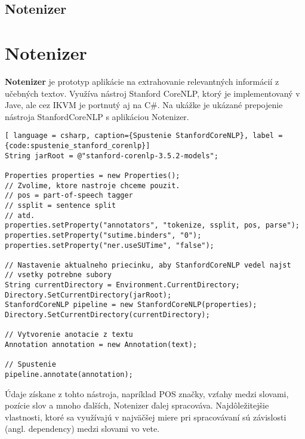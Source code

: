 %
%
{
	\subsection{Notenizer} 
}
{
	\section{Notenizer}
}
\label{subsection:notenizer}
\textbf{Notenizer} je prototyp aplikácie na extrahovanie relevantných informácií z učebných textov. Využíva nástroj Stanford CoreNLP, ktorý je implementovaný v Jave, ale cez IKVM je portnutý aj na C\#. Na ukážke  je ukázané prepojenie nástroja StanfordCoreNLP s aplikáciou Notenizer. 
\\

\begin{lstlisting}[ language = csharp, caption={Spustenie StanfordCoreNLP}, label = {code:spustenie_stanford_corenlp}]
String jarRoot = @"stanford-corenlp-3.5.2-models";

Properties properties = new Properties();
// Zvolime, ktore nastroje chceme pouzit.
// pos = part-of-speech tagger
// ssplit = sentence split
// atd.
properties.setProperty("annotators", "tokenize, ssplit, pos, parse");
properties.setProperty("sutime.binders", "0");
properties.setProperty("ner.useSUTime", "false");

// Nastavenie aktualneho priecinku, aby StanfordCoreNLP vedel najst
// vsetky potrebne subory
String currentDirectory = Environment.CurrentDirectory;
Directory.SetCurrentDirectory(jarRoot);
StanfordCoreNLP pipeline = new StanfordCoreNLP(properties);
Directory.SetCurrentDirectory(currentDirectory);

// Vytvorenie anotacie z textu
Annotation annotation = new Annotation(text);

// Spustenie
pipeline.annotate(annotation);
\end{lstlisting}

Údaje získane z tohto nástroja, napríklad POS značky, vzťahy medzi slovami, pozície slov a mnoho ďalších, Notenizer ďalej spracováva. Najdôležitejšie vlastnosti, ktoré sa využívajú v najväčšej miere pri spracovávaní sú závislosti (angl. dependency) medzi slovami vo vete.  

